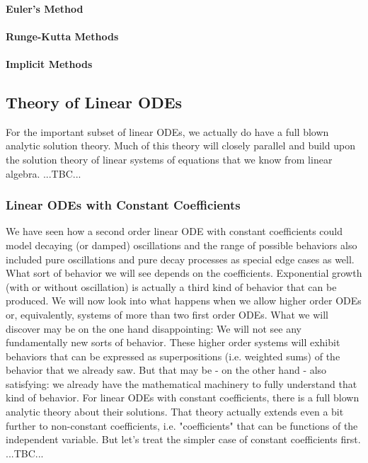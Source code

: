 \paragraph{Euler's Method}

\paragraph{Runge-Kutta Methods}

\paragraph{Implicit Methods}




\subsection{Theory of Linear ODEs}
For the important subset of linear ODEs, we actually do have a full blown analytic solution theory. Much of this theory will closely parallel and build upon the solution theory of linear systems of equations that we know from linear algebra. ...TBC...






\subsubsection{Linear ODEs with Constant Coefficients}
We have seen how a second order linear ODE with constant coefficients could model decaying (or damped) oscillations and the range of possible behaviors also included pure oscillations and pure decay processes as special edge cases as well. What sort of behavior we will see depends on the coefficients. Exponential growth (with or without oscillation) is actually a third kind of behavior that can be produced. We will now look into what happens when we allow higher order ODEs or, equivalently, systems of more than two first order ODEs. What we will discover may be on the one hand disappointing: We will not see any fundamentally new sorts of behavior. These higher order systems will exhibit behaviors that can be expressed as superpositions (i.e. weighted sums) of the behavior that we already saw. But that may be - on the other hand - also satisfying: we already have the mathematical machinery to fully understand that kind of behavior. For linear ODEs with constant coefficients, there is a full blown analytic theory about their solutions. That theory actually extends even a bit further to non-constant coefficients, i.e. "coefficients" that can be functions of the independent variable. But let's treat the simpler case of constant coefficients first. ...TBC...

